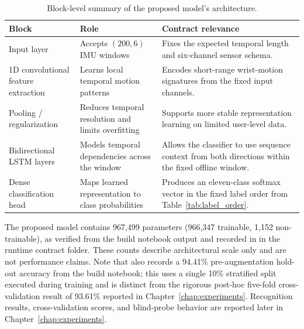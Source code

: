 \renewcommand{\arraystretch}{1.15}
\begin{table}[htbp]
\centering
\footnotesize
\caption[Block-level summary of the proposed model's architecture.]{Block-level summary of the proposed model's architecture.}
\label{tab:d1_architecture_summary}
\begin{tabularx}{\textwidth}{p{3.3cm} p{3.4cm} X}
\toprule
\textbf{Block} & \textbf{Role} & \textbf{Contract relevance} \\
\midrule
Input layer
& Accepts \((200,6)\) IMU windows
& Fixes the expected temporal length and six-channel sensor schema. \\

1D convolutional feature extraction
& Learns local temporal motion patterns
& Encodes short-range wrist-motion signatures from the fixed input channels. \\

Pooling / regularization
& Reduces temporal resolution and limits overfitting
& Supports more stable representation learning on limited user-level data. \\

Bidirectional LSTM layers
& Models temporal dependencies across the window
& Allows the classifier to use sequence context from both directions within the fixed offline window. \\

Dense classification head
& Maps learned representation to class probabilities
& Produces an eleven-class softmax vector in the fixed label order from Table~\ref{tab:label_order}. \\
\bottomrule
\end{tabularx}
\renewcommand{\arraystretch}{1.0}
\end{table}

The proposed model contains 967,499 parameters (966,347 trainable, 1,152 non-trainable), as verified from the build notebook output and recorded in  in the runtime contract folder. These counts describe architectural scale only and are not performance claims. Note that  also records a 94.41\% pre-augmentation hold-out accuracy from the build notebook; this uses a single 10\% stratified split executed during training and is distinct from the rigorous post-hoc five-fold cross-validation result of 93.61\% reported in Chapter~\ref{chap:experiments}. Recognition results, cross-validation scores, and blind-probe behavior are reported later in Chapter~\ref{chap:experiments}.

